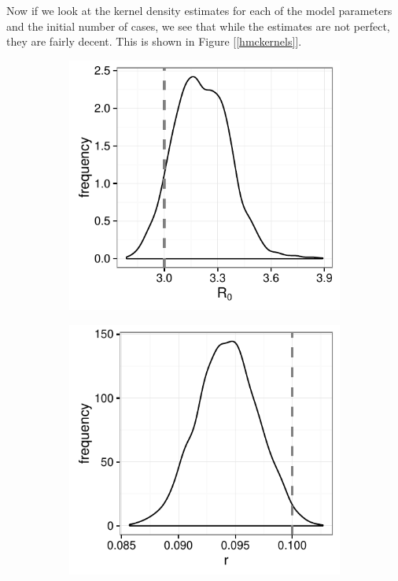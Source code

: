     Now if we look at the kernel density estimates for each of the model parameters and the initial number of cases, we see that while the estimates are not perfect, they are fairly decent. This is shown in Figure [\ref{hmckernels}].

    \begin{figure}
    	\centering
    	\captionsetup{width=0.8\linewidth}
        \begin{subfigure}[tl]{0.4\textwidth}
            \includegraphics[width=\textwidth]{./images/kernelR0.pdf}
        \end{subfigure}
        \begin{subfigure}[tr]{0.4\textwidth}
            \includegraphics[width=\textwidth]{./images/kernelr.pdf}

\end{subfigure}
\end{figure}
